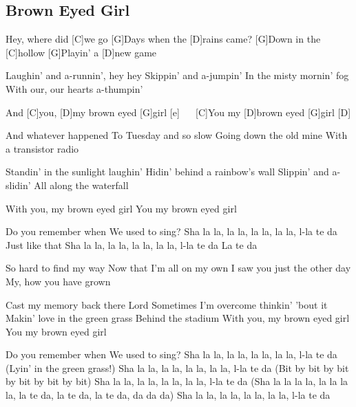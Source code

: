 \subsection*{Brown Eyed Girl   }
\begin{guitar}
[G]Hey, where did [C]we go
[G]Days when the [D]rains came?
[G]Down in the [C]hollow
[G]Playin' a [D]new game

Laughin' and a-runnin', hey hey
Skippin' and a-jumpin'
In the misty mornin' fog
With our, our hearts a-thumpin'

And [C]you, [D]my brown eyed [G]girl [e] $\quad$
[C]You my [D]brown eyed [G]girl [D] $\quad$

And whatever happened
To Tuesday and so slow
Going down the old mine
With a transistor radio

Standin' in the sunlight laughin'
Hidin' behind a rainbow's wall
Slippin' and a-slidin'
All along the waterfall

With you, my brown eyed girl
You my brown eyed girl

Do you remember when
We used to sing?
Sha la la, la la, la la, la la, l-la te da
Just like that
Sha la la, la la, la la, la la, l-la te da
La te da

So hard to find my way
Now that I'm all on my own
I saw you just the other day
My, how you have grown

Cast my memory back there Lord
Sometimes I'm overcome thinkin' 'bout it
Makin' love in the green grass
Behind the stadium
With you, my brown eyed girl
You my brown eyed girl

Do you remember when
We used to sing?
Sha la la, la la, la la, la la, l-la te da
(Lyin' in the green grass!)
Sha la la, la la, la la, la la, l-la te da
(Bit by bit by bit by bit by bit by bit)
Sha la la, la la, la la, la la, l-la te da
(Sha la la la la, la la la la, la te da, la te da, la te da, da da da)
Sha la la, la la, la la, la la, l-la te da



\end{guitar}
